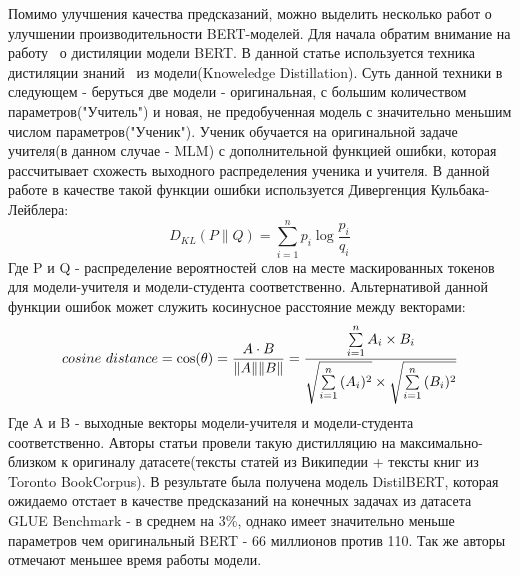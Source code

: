 \par Помимо улучшения качества предсказаний, можно выделить несколько работ о улучшении производительности BERT-моделей. Для начала обратим внимание на работу~\cite{distilbert} о дистиляции модели BERT. В данной статье используется техника дистиляции знаний~\cite{know-dist} из модели(Knoweledge Distillation). Суть данной техники в следующем - беруться две модели - оригинальная, с большим количеством параметров("Учитель") и новая, не предобученная модель с значительно меньшим числом параметров("Ученик"). Ученик обучается на оригинальной задаче учителя(в данном случае - MLM) с дополнительной функцией ошибки, которая рассчитывает схожесть выходного распределения ученика и учителя. В данной работе в качестве такой функции ошибки используется Дивергенция Кульбака-Лейблера: $$D_{KL}(P\parallel Q)=\sum \limits _{i=1}^{n}p_{i}\log {\frac {p_{i}}{q_{i}}}$$ Где P и Q - распределение вероятностей слов на месте маскированных токенов для модели-учителя и модели-студента соответственно.
Альтернативой данной функции ошибок может служить косинусное расстояние между векторами: $$cosine~distance=\cos(\theta )={A\cdot B \over \|A\|\|B\|}={\frac  {\sum \limits _{{i=1}}^{{n}}{A_{i}\times B_{i}}}{{\sqrt  {\sum \limits _{{i=1}}^{{n}}{(A_{i})^{2}}}}\times {\sqrt  {\sum \limits _{{i=1}}^{{n}}{(B_{i})^{2}}}}}}$$ Где A и B - выходные векторы модели-учителя и модели-студента соответственно.
Авторы статьи провели такую дистилляцию на максимально-близком к оригиналу датасете(тексты статей из Википедии + тексты книг из Toronto BookCorpus). В результате была получена модель DistilBERT, которая ожидаемо отстает в качестве предсказаний на конечных задачах из датасета GLUE Benchmark - в среднем на 3\%, однако имеет значительно меньше параметров чем оригинальный BERT - 66 миллионов против 110. Так же авторы отмечают меньшее время работы модели.

